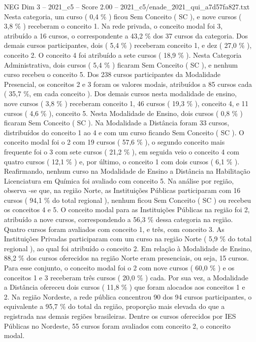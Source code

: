 \begin{textsample}{NEG Dim 3 – 2021\_c5 – Score 2.00 – 2021\_c5/enade\_2021\_qui\_a7d57fa827.txt}
Nesta categoria, um curso ( 0,4 \% ) ficou Sem Conceito ( SC ), e nove cursos ( 3,8 \% ) receberam o conceito 1.
Na rede privada, o conceito modal foi 3, atribuído a 16 cursos, o correspondente a 43,2 \% dos 37 cursos da categoria.
Dos demais cursos participantes, dois ( 5,4 \% ) receberam conceito 1, e dez ( 27,0 \% ), conceito 2.
O conceito 4 foi atribuído a sete cursos ( 18,9 \% ).
Nesta Categoria Administrativa, dois cursos ( 5,4 \% ) ficaram Sem Conceito ( SC ), e nenhum curso recebeu o conceito 5.
Dos 238 cursos participantes da Modalidade Presencial, os conceitos 2 e 3 foram os valores modais, atribuídos a 85 cursos cada ( 35,7 \%, em cada conceito ).
Dos demais cursos nesta modalidade de ensino, nove cursos ( 3,8 \% ) receberam conceito 1, 46 cursos ( 19,3 \% ), conceito 4, e 11 cursos ( 4,6 \% ), conceito 5.
Nesta Modalidade de Ensino, dois cursos ( 0,8 \% ) ficaram Sem Conceito ( SC ).
Na Modalidade a Distância foram 33 cursos, distribuídos do conceito 1 ao 4 e com um curso ficando Sem Conceito ( SC ).
O conceito modal foi o 2 com 19 cursos ( 57,6 \% ), o segundo conceito mais frequente foi o 3 com sete cursos ( 21,2 \% ), em seguida veio o conceito 4 com quatro cursos ( 12,1 \% ) e, por último, o conceito 1 com dois cursos ( 6,1 \% ).
Reafirmando, nenhum curso na Modalidade de Ensino a Distância na Habilitação Licenciatura em Química foi avaliado com conceito 5.
Na análise por região, observa -se que, na região Norte, as Instituições Públicas participaram com 16 cursos ( 94,1 \% do total regional ), nenhum ficou Sem Conceito ( SC ) ou recebeu os conceitos 4 e 5.
O conceito modal para as Instituições Públicas na região foi 2, atribuído a nove cursos, correspondendo a 56,3 \% dessa categoria na região.
Quatro cursos foram avaliados com conceito 1, e três, com conceito 3.
As Instituições Privadas participaram com um curso na região Norte ( 5,9 \% do total regional ), ao qual foi atribuído o conceito 2.
Em relação à Modalidade de Ensino, 88,2 \% dos cursos oferecidos na região Norte eram presenciais, ou seja, 15 cursos.
Para esse conjunto, o conceito modal foi o 2 com nove cursos ( 60,0 \% ) e os conceitos 1 e 3 receberam três cursos ( 20,0 \% ) cada.
Por sua vez, a Modalidade a Distância ofereceu dois cursos ( 11,8 \% ) que foram alocados aos conceitos 1 e 2.
Na região Nordeste, a rede pública concentrou 90 dos 94 cursos participantes, o equivalente a 95,7 \% do total da região, proporção mais elevada do que a registrada nas demais regiões brasileiras.
Dentre os cursos oferecidos por IES Públicas no Nordeste, 55 cursos foram avaliados com conceito 2, o conceito modal.

\end{textsample}
